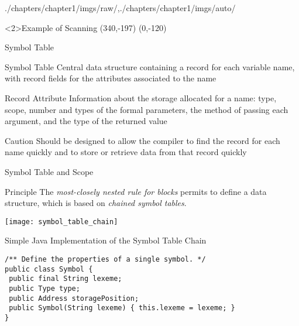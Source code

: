 \begin{graphicspathcontext}{{./chapters/chapter1/imgs/raw/},{./chapters/chapter1/imgs/auto/}}
\begin{bibunit}[apalike]
\begin{frame}<2>{Example of Scanning}
	\putat*(340,-197){}
	\putat(0,-120){}
\end{frame}

\begin{frame}{Symbol Table}
	\begin{definitionblock}{Symbol Table}
		Central data structure containing a record for each variable name, with record fields for the attributes associated to the name
	\end{definitionblock}
	\vspace{.5cm}
	\begin{definitionblock}{Record Attribute}
		Information about the storage allocated for a name: type, scope, number and types of the formal parameters, the method of passing each argument, and the type of the returned value
	\end{definitionblock}
	\vspace{.5cm}
	\begin{alertblock}{Caution}
		Should be designed to allow the compiler to find the record for each name quickly and to store or retrieve data from that record quickly
	\end{alertblock}
\end{frame}

\begin{frame}{Symbol Table and Scope}
	\vspace{.25cm}
	\begin{block}{Principle}
		The \emph{most-closely nested rule for blocks} permits to define a data structure, which is based on \emph{chained symbol tables}.
	\end{block}
	\begin{center}
		\texttt{[image: symbol\_table\_chain]}
	\end{center}
\end{frame}

\begin{frame}[t,fragile]{{Simple Java Implementation} of the Symbol Table Chain}
	\begin{lstlisting}[style=lststyle-java]
/** Define the properties of a single symbol. */
public class Symbol {
 public final String lexeme;
 public Type type;
 public Address storagePosition;
 public Symbol(String lexeme) { this.lexeme = lexeme; }
}


\end{lstlisting}
\end{frame}
\end{bibunit}
\end{graphicspathcontext}
